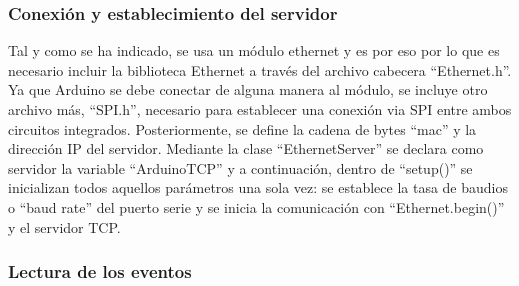 \subsubsection{Conexión y establecimiento del servidor}\label{s3_5_2_1}

Tal y como se ha indicado, se usa un módulo ethernet y es por eso por lo que es necesario incluir la biblioteca Ethernet a través del archivo cabecera ``Ethernet.h''. Ya que Arduino se debe conectar de alguna manera al módulo, se incluye otro archivo más, ``SPI.h'', necesario para establecer una conexión via SPI entre ambos circuitos integrados. Posteriormente, se define la cadena de bytes ``mac'' y la dirección IP del servidor. Mediante la clase ``EthernetServer'' se declara como servidor la variable ``ArduinoTCP'' y a continuación, dentro de ``setup()'' se inicializan todos aquellos parámetros una sola vez: se establece la tasa de baudios o ``baud rate'' del puerto serie y se inicia la comunicación con ``Ethernet.begin()'' y el servidor TCP.



\subsubsection{Lectura de los eventos}\label{s3_5_2_1}

